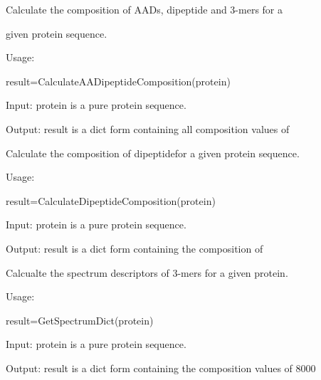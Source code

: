 \documentclass[letterpaper,10pt,english]{sphinxmanual}
\begin{document}
\begin{fulllineitems}
\label{reference/PyProteinAAComposition:PyProteinAAComposition.CalculateAADipeptideComposition}
Calculate the composition of AADs, dipeptide and 3-mers for a

given protein sequence.

Usage:

result=CalculateAADipeptideComposition(protein)

Input: protein is a pure protein sequence.

Output: result is a dict form containing all composition values of

\end{fulllineitems}


\begin{fulllineitems}
\label{reference/PyProteinAAComposition:PyProteinAAComposition.CalculateDipeptideComposition}
Calculate the composition of dipeptidefor a given protein sequence.

Usage:

result=CalculateDipeptideComposition(protein)

Input: protein is a pure protein sequence.

Output: result is a dict form containing the composition of

\end{fulllineitems}


\begin{fulllineitems}
\label{reference/PyProteinAAComposition:PyProteinAAComposition.GetSpectrumDict}
Calcualte the spectrum descriptors of 3-mers for a given protein.

Usage:

result=GetSpectrumDict(protein)

Input: protein is a pure protein sequence.

Output: result is a dict form containing the composition values of 8000

\end{fulllineitems}
\end{document}
